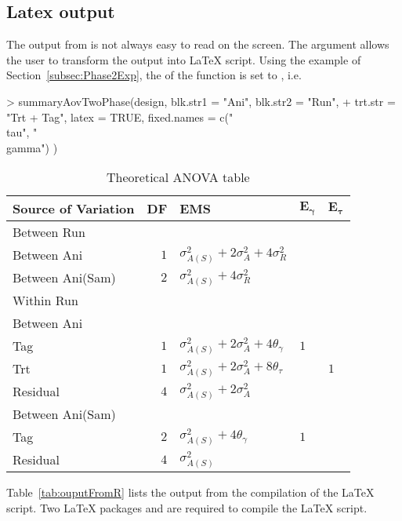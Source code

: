 \documentclass[article]{jss}
\begin{document}
\subsection{Latex output}
The output from  is not always easy to read on the screen. The argument  allows the user to transform the  output into {\LaTeX} script. Using the example of Section~\ref{subsec:Phase2Exp}, the  of the  function is set to , i.e.\
\begin{CodeChunk}
\begin{CodeInput} 
> summaryAovTwoPhase(design, blk.str1 = "Ani", blk.str2 = "Run", 
+ trt.str = "Trt + Tag", latex = TRUE, fixed.names = c("\\tau", "\\gamma") ) 
\end{CodeInput}
\begin{CodeOutput}
\begin{table}[ht]
\centering
\caption{Theoretical ANOVA table}
\begin{tabular}[t]{lrlll} 
\toprule 
 \multicolumn{1}{l}{\textbf{Source of Variation}} & \multicolumn{1}{l}{\textbf{DF}} &
 \multicolumn{1}{l}{\textbf{EMS}}& \multicolumn{1}{l}{$\bm{E_{\gamma}}$}&
 \multicolumn{1}{l}{$\bm{E_{\tau}}$}\\ 
 \midrule 
 Between Run &  &  & & \\ 
 \quad Between Ani & $1$ & $\sigma_{A(S)}^2+2\sigma_{A}^2+4\sigma_{R}^2$ & & \\ \hline 
 \quad Between Ani(Sam) & $2$ & $\sigma_{A(S)}^2+4\sigma_{R}^2$ & & \\ \hline 
 Within Run &  &  & & \\ 
 \quad Between Ani &  &  & & \\ 
 \quad \quad Tag & $1$ & $\sigma_{A(S)}^2+2\sigma_{A}^2+4\theta_{\gamma}$ &$1$ & \\ 
 \quad \quad Trt & $1$ & $\sigma_{A(S)}^2+2\sigma_{A}^2+8\theta_{\tau}$ & & $1$\\ 
 \quad \quad Residual & $4$ & $\sigma_{A(S)}^2+2\sigma_{A}^2$ & & \\ \hline 
 \quad Between Ani(Sam) &  &  & & \\ 
 \quad \quad Tag & $2$ & $\sigma_{A(S)}^2+4\theta_{\gamma}$ &$1$ & \\ 
 \quad \quad Residual & $4$ & $\sigma_{A(S)}^2$ & & \\ 
\bottomrule 
\end{tabular} 
\label{tab:} 
\end{table} 
\end{CodeOutput}
\end{CodeChunk} 
Table~\ref{tab:ouputFromR} lists the output from the compilation of the {\LaTeX} script. Two {\LaTeX} packages  and  are required to compile the {\LaTeX} script. 
\end{document}
